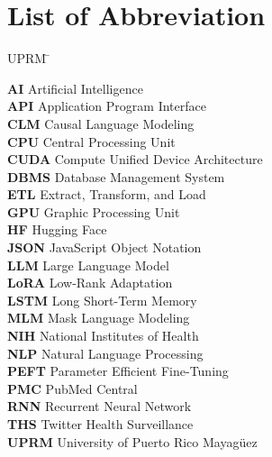 

\chapter*{List of Abbreviation}

 \noindent
\vspace{-1.75\baselineskip}
  \begin{tabbing}
UPRM \=  \kill %

\textbf{AI} \> Artificial Intelligence\\
\textbf{API} \> Application Program Interface\\
\textbf{CLM} \> Causal Language Modeling\\
\textbf{CPU} \> Central Processing Unit\\
\textbf{CUDA} \> Compute Unified Device Architecture\\
\textbf{DBMS} \> Database Management System\\
\textbf{ETL} \> Extract, Transform, and Load \\
\textbf{GPU} \> Graphic Processing Unit\\
\textbf{HF} \> Hugging Face\\
\textbf{JSON} \> JavaScript Object Notation\\
\textbf{LLM} \> Large Language Model\\
\textbf{LoRA} \> Low-Rank Adaptation\\
\textbf{LSTM} \> Long Short-Term Memory\\
\textbf{MLM} \> Mask Language Modeling\\
\textbf{NIH} \> National Institutes of Health\\
\textbf{NLP} \> Natural Language Processing\\
\textbf{PEFT} \> Parameter Efficient Fine-Tuning\\
\textbf{PMC} \> PubMed Central\\
\textbf{RNN} \> Recurrent Neural Network\\
\textbf{THS} \> Twitter Health Surveillance\\
\textbf{UPRM} \> University of Puerto Rico Mayag\"uez\\


\end{tabbing}